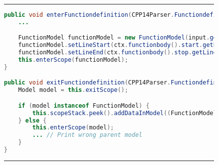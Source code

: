 \begin{figure}[H]
\noindent\rule{\textwidth}{1pt}
\begin{lstlisting}[language=Java, caption={Antlr C++ listener example}, label={lst:antlrCPPListenerExample}]
public void enterFunctiondefinition(CPP14Parser.FunctiondefinitionContext ctx) {
	...

	FunctionModel functionModel = new FunctionModel(input.getText(interval));
	functionModel.setLineStart(ctx.functionbody().start.getLine());
	functionModel.setLineEnd(ctx.functionbody().stop.getLine());
	this.enterScope(functionModel);
}

public void exitFunctiondefinition(CPP14Parser.FunctiondefinitionContext ctx) {
	Model model = this.exitScope();

	if (model instanceof FunctionModel) {
		this.scopeStack.peek().addDataInModel((FunctionModel) model);
	} else {
		this.enterScope(model);
		... // Print wrong parent model
	}
}
\end{lstlisting}
\noindent\rule{\textwidth}{1pt}
\end{figure}